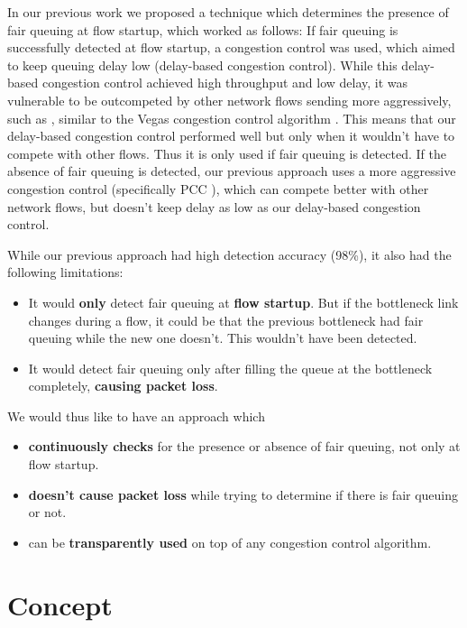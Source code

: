 \documentclass[conference]{IEEEtran}
\begin{document}
In our previous work we proposed a technique which determines the presence of fair queuing at flow startup, which worked as follows: 
If fair queuing is successfully detected at flow startup, a congestion control was used, which aimed to keep queuing delay low (delay-based congestion control). 
While this delay-based congestion control achieved high throughput and low delay, it was vulnerable to be outcompeted by other network flows sending more aggressively, such as \cite{cardwell_bbr_2016,dong_pcc_2015,ha_cubic_2008}, 
similar to the Vegas congestion control algorithm \cite{brakmo_tcp_1995}.
This means that our delay-based congestion control performed well but only when it wouldn't have to compete with other flows. Thus it is only used if fair queuing is detected. 
If the absence of fair queuing is detected, our previous approach uses a more aggressive congestion control (specifically PCC \cite{dong_pcc_2015}), which can compete better with other network flows,
but doesn't keep delay as low as our delay-based congestion control. 

While our previous approach had high detection accuracy (98\%), it also had the following limitations:
\begin{itemize}
    \item It would \textbf{only} detect fair queuing at \textbf{flow startup}. 
    But if the bottleneck link changes during a flow, it could be that the previous bottleneck had fair queuing while the new one doesn't. This wouldn't have been detected. 
    \item It would detect fair queuing only after filling the queue at the bottleneck completely, \textbf{causing packet loss}. 
\end{itemize}

We would thus like to have an approach which 
\begin{itemize}
    \item \textbf{continuously checks} for the presence or absence of fair queuing, not only at flow startup. 
    \item \textbf{doesn't cause packet loss} while trying to determine if there is fair queuing or not. 
    \item can be \textbf{transparently used} on top of any congestion control algorithm. 
\end{itemize} 

\section{Concept}
\end{document}
